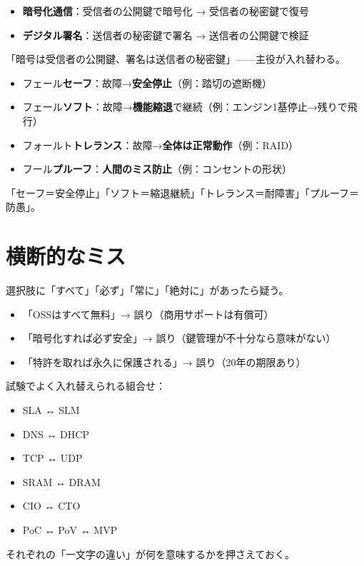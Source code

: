 \begin{yokumiss}[公開鍵暗号とデジタル署名の鍵の混同]
\begin{itemize}
  \item \textbf{暗号化通信}：受信者の公開鍵で暗号化 → 受信者の秘密鍵で復号
  \item \textbf{デジタル署名}：送信者の秘密鍵で署名 → 送信者の公開鍵で検証
\end{itemize}
「暗号は受信者の公開鍵、署名は送信者の秘密鍵」——主役が入れ替わる。
\end{yokumiss}

\begin{yokumiss}
\begin{itemize}
  \item フェール\textbf{セーフ}：故障→\textbf{安全停止}（例：踏切の遮断機）
  \item フェール\textbf{ソフト}：故障→\textbf{機能縮退}で継続（例：エンジン1基停止→残りで飛行）
  \item フォールト\textbf{トレランス}：故障→\textbf{全体は正常動作}（例：RAID）
  \item フール\textbf{プルーフ}：\textbf{人間のミス防止}（例：コンセントの形状）
\end{itemize}
「セーフ＝安全停止」「ソフト＝縮退継続」「トレランス＝耐障害」「プルーフ＝防愚」。
\end{yokumiss}

\section*{横断的なミス}

\begin{yokumiss}
選択肢に「すべて」「必ず」「常に」「絶対に」があったら疑う。
\begin{itemize}
  \item 「OSSはすべて無料」→ 誤り（商用サポートは有償可）
  \item 「暗号化すれば必ず安全」→ 誤り（鍵管理が不十分なら意味がない）
  \item 「特許を取れば永久に保護される」→ 誤り（20年の期限あり）
\end{itemize}
\end{yokumiss}

\begin{yokumiss}[似た略語の入れ替え]
試験でよく入れ替えられる組合せ：
\begin{itemize}
  \item SLA ↔ SLM
  \item DNS ↔ DHCP
  \item TCP ↔ UDP
  \item SRAM ↔ DRAM
  \item CIO ↔ CTO
  \item PoC ↔ PoV ↔ MVP
\end{itemize}
それぞれの「一文字の違い」が何を意味するかを押さえておく。
\end{yokumiss}

